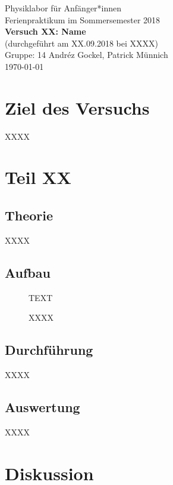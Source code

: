 \documentclass[11pt,a4paper]{article}
\newcommand{\halftime}[4]{\begin{figure}[h]
\begin{minipage}{.#1\textwidth}#3\end{minipage}\begin{minipage}{.#2\textwidth}
\centering
#4\end{minipage}
\end{figure}}
\begin{document}
{
\centering 
\large 
Physiklabor für Anf\"anger*innen \\
Ferienpraktikum im Sommersemester 2018 \\[4mm]
\textbf{\LARGE 
Versuch XX: Name
} \\[3mm]
(durchgef\"uhrt am XX.09.2018 bei XXXX) \\
Gruppe: 14 Andréz Gockel, Patrick M\"unnich\\
\today \\[10mm]
}

\vspace{50pt}
\tableofcontents
\vspace{22pt}
\listoftables
\vspace{22pt}
\listoffigures
\pagebreak

\section{Ziel des Versuchs}
XXXX
\section{Teil XX}

\subsection{Theorie}

XXXX

\subsection{Aufbau}

\halftime{5}{5}{TEXT}{
   \renewcommand\thefigure{BX}
\caption[XXXX]{XXXX \cite{Anleitung}}
\label{Pic:X}}

\subsection{Durchführung}

XXXX

\subsection{Auswertung}

XXXX

\section{Diskussion}
\end{document}
